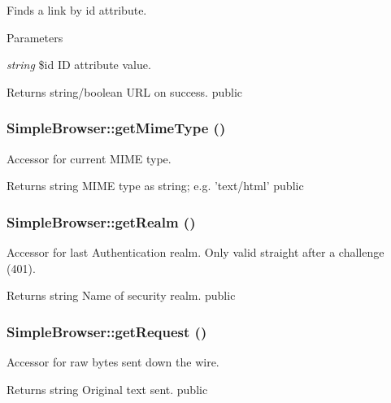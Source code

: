 \label{class_simple_browser_a1992ecd8ed0630eab26076c6e501910a}
Finds a link by id attribute. 
\begin{DoxyParams}{Parameters}
\item[{\em string}]\$id ID attribute value. \end{DoxyParams}
\begin{DoxyReturn}{Returns}
string/boolean URL on success.  public 
\end{DoxyReturn}
\hypertarget{class_simple_browser_a39e85378a12be207e0b97fd702d9447d}{
\subsubsection[{getMimeType}]{\setlength{\rightskip}{0pt plus 5cm}SimpleBrowser::getMimeType ()}}
\label{class_simple_browser_a39e85378a12be207e0b97fd702d9447d}
Accessor for current MIME type. \begin{DoxyReturn}{Returns}
string MIME type as string; e.g. 'text/html'  public 
\end{DoxyReturn}
\hypertarget{class_simple_browser_a4183d97a5f3b05566c8cad395881c413}{
\subsubsection[{getRealm}]{\setlength{\rightskip}{0pt plus 5cm}SimpleBrowser::getRealm ()}}
\label{class_simple_browser_a4183d97a5f3b05566c8cad395881c413}
Accessor for last Authentication realm. Only valid straight after a challenge (401). \begin{DoxyReturn}{Returns}
string Name of security realm.  public 
\end{DoxyReturn}
\hypertarget{class_simple_browser_a51cfc002c152bf6d83311b361a5ca10e}{
\subsubsection[{getRequest}]{\setlength{\rightskip}{0pt plus 5cm}SimpleBrowser::getRequest ()}}
\label{class_simple_browser_a51cfc002c152bf6d83311b361a5ca10e}
Accessor for raw bytes sent down the wire. \begin{DoxyReturn}{Returns}
string Original text sent.  public 
\end{DoxyReturn}
